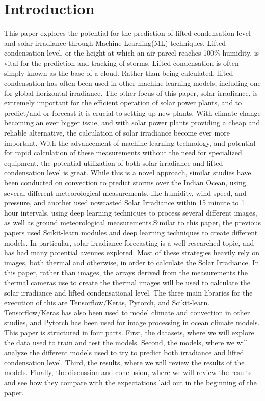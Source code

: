 \documentclass[conference]{IEEEtran}
\begin{document}
\section{Introduction}
This paper explores the potential for the prediction of lifted condensation level and solar irradiance through Machine Learning(ML) techniques. Lifted condensation level, or the height at which an air parcel reaches 100\% humidity, is vital for the prediction and tracking of storms\cite{1}. Lifted condensation is often simply known as the base of a cloud. Rather than being calculated, lifted condensation has often been used in other machine learning models, including one for global horizontal irradiance\cite{2}. The other focus of this paper, solar irradiance, is extremely important for the efficient operation of solar power plants, and to predict/and or forecast it is crucial to setting up new plants\cite{3}. With climate change becoming an ever bigger issue, and with solar power plants providing a cheap and reliable alternative, the calculation of solar irradiance become ever more important. With the advancement of machine learning technology, and potential for rapid calculation of these measurements without the need for specialized equipment, the potential utilization of both solar irradiance and lifted condensation level is great. While this is a novel approach, similar studies have been conducted on convection to predict storms over the Indian Ocean, using several different meteorological measurements, like humidity, wind speed, and pressure, and another used nowcasted Solar Irradiance within 15 minute to 1 hour intervals, using deep learning techniques to process several different images, as well as ground meteorological measurements\cite{4, 5}.Similar to this paper, the previous papers used Scikit-learn modules and deep learning techniques to create different models. In particular, solar irradiance forecasting is a well-researched topic, and has had many potential avenues explored\cite{5,6,7}. Most of these strategies heavily rely on images, both thermal and otherwise, in order to calculate the Solar Irradiance. In this paper, rather than images, the arrays derived from the measurements the thermal cameras use to create the thermal images will be used to calculate the solar irradiance and lifted condensational level. The three main libraries for the execution of this are Tensorflow/Keras, Pytorch, and Scikit-learn. Tensorflow/Keras has also been used to model climate and convection in other studies, and Pytorch has been used for image processing in ocean climate models\cite{8,9}. This paper is structured in four parts. First, the datasets, where we will explore the data used to train and test the models. Second, the models, where we will analyze the different models used to try to predict both irradiance and lifted condensation level. Third, the results, where we will review the results of the models. Finally, the discussion and conclusion, where we will review the results and see how they compare with the expectations laid out in the beginning of the paper. 
\end{document}
